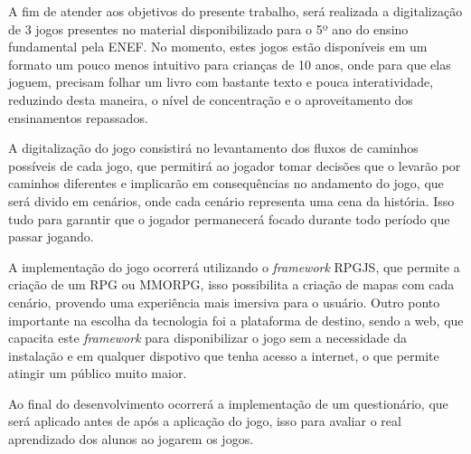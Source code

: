         A fim de atender aos objetivos do presente trabalho, será realizada a digitalização de 3 jogos presentes no
        material disponibilizado para o 5º ano do ensino fundamental pela ENEF. No momento, estes jogos estão
        disponíveis em um formato um pouco menos intuitivo para crianças de 10 anos, onde para que elas joguem, precisam
        folhar um livro com bastante texto e pouca interatividade, reduzindo desta maneira, o nível de concentração e o
        aproveitamento dos ensinamentos repassados.

        A digitalização do jogo consistirá no levantamento dos fluxos de caminhos possíveis de cada jogo, que permitirá
        ao jogador tomar decisões que o levarão por caminhos diferentes e implicarão em consequências no andamento do
        jogo, que será divido em cenários, onde cada cenário representa uma cena da história. Isso tudo para garantir
        que o jogador permanecerá focado durante todo período que passar jogando.

        A implementação do jogo ocorrerá utilizando o \textit{framework} RPGJS, que permite a criação de um RPG ou MMORPG, isso
        possibilita a criação de mapas com cada cenário, provendo uma experiência mais imersiva para o usuário.
        Outro ponto importante na escolha da tecnologia foi a plataforma de destino, sendo a web, que capacita este
        \textit{framework} para disponibilizar o jogo sem a necessidade da instalação e em qualquer dispotivo que tenha
        acesso a internet, o que permite atingir um público muito maior.

        Ao final do desenvolvimento ocorrerá a implementação de um questionário, que será aplicado antes de após a
        aplicação do jogo, isso para avaliar o real aprendizado dos alunos ao jogarem os jogos.

